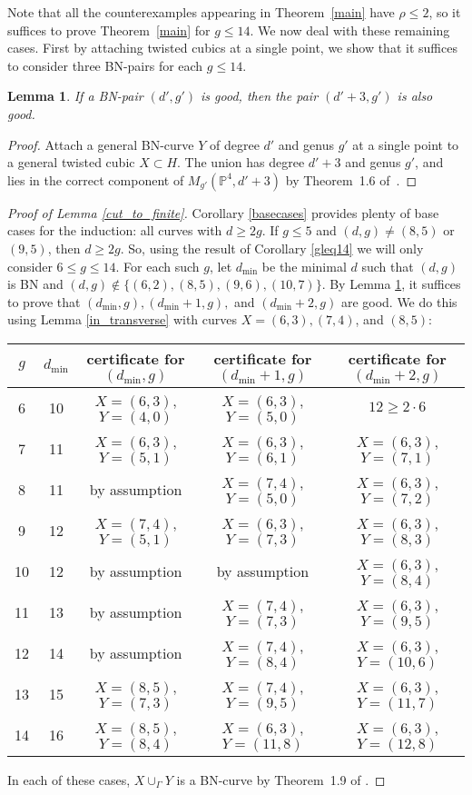 \documentclass[11pt]{amsart}
\newcommand{\pp}{\mathbb{P}}
\newtheorem{lem}[thm]{Lemma}
\theoremstyle{definition}
\theoremstyle{remark}
\begin{document}
Note that all the counterexamples appearing in Theorem~\ref{main}
have $\rho \leq 2$,
so it suffices to prove Theorem~\ref{main} for $g \leq 14$.
We now deal with these remaining cases.  First by attaching twisted cubics at a single point, we show that it suffices to consider three BN-pairs for each $g \leq 14$.

\begin{lem}\label{3ds}
If a BN-pair $(d', g')$ is good, then the pair $(d'+ 3, g')$ is also good.
\end{lem}
\begin{proof}
Attach a general BN-curve $Y$ of degree $d'$ and genus $g'$ at a single point to a general twisted cubic $X \subset H$.  The union has degree $d'+3$ and genus $g'$, and lies in the correct component of $M_{g'}(\pp^4, d'+3)$ by Theorem~1.6 of~\cite{rbn}. 
\end{proof}

\begin{proof}[{Proof of Lemma \ref{cut_to_finite}}]
Corollary \ref{basecases} provides plenty of base cases for the induction: all curves with $d \geq 2g$.    If $g \leq 5$ and $(d,g) \neq (8,5)$ or $(9,5)$, then $d \geq 2g$.  So, using the result of Corollary \ref{gleq14} we will only consider $6\leq g \leq 14$.  For each such $g$, let $d_{\min}$ be the minimal $d$ such that $(d,g)$ is BN and $(d,g) \notin \{(6,2), (8,5), (9,6), (10,7)\}$.
By Lemma \ref{3ds}, it suffices to prove that $(d_{\min}, g), (d_{\min} +1, g),$ and $(d_{\min} + 2, g)$ are good.  We do this using Lemma \ref{in_transverse} with curves $X = (6,3), (7,4)$, and $(8,5)$:
\begin{center}
\begin{tabular}{c | c | c | c | c}
$g$ & $d_{\min}$ & certificate for $(d_{\min}, g)$ & certificate for $(d_{\min}+1, g)$ & certificate for $(d_{\min}+2, g)$ \\ \hline
6 & 10 & $X = (6,3)$, $Y= (4,0)$ & $X = (6,3)$, $Y = (5,0)$ & $12 \geq 2\cdot 6$ \\
7 & 11 & $X = (6,3)$, $Y= (5,1)$ & $X = (6,3)$, $Y = (6,1)$ & $X = (6,3)$, $Y = (7,1)$ \\
8 & 11 & by assumption & $X = (7,4)$, $Y = (5,0)$ & $X = (6,3)$, $Y = (7,2)$ \\
9 & 12 & $X = (7,4)$, $Y= (5,1)$ & $X = (6,3)$, $Y = (7,3)$ & $X = (6,3)$, $Y = (8,3)$ \\
10 & 12 & by assumption & by assumption & $X = (6,3)$, $Y = (8,4)$ \\
11 & 13 & by assumption & $X = (7,4)$, $Y = (7,3)$ & $X = (6,3)$, $Y = (9,5)$ \\
12 & 14 & by assumption & $X = (7,4)$, $Y = (8,4)$ & $X = (6,3)$, $Y = (10,6)$ \\
13 & 15 & $X = (8,5)$, $Y = (7,3)$ & $X = (7,4)$, $Y = (9,5)$ & $X = (6,3)$, $Y = (11,7)$ \\
14 & 16 & $X = (8,5)$, $Y = (8,4)$ & $X = (6,3)$, $Y = (11,8)$ & $X = (6,3)$, $Y = (12,8)$ 
\end{tabular}
\end{center}
In each of these cases, $X \cup_\Gamma Y$ is a BN-curve by Theorem~1.9 of \cite{rbn}.
\end{proof}
\end{document}

